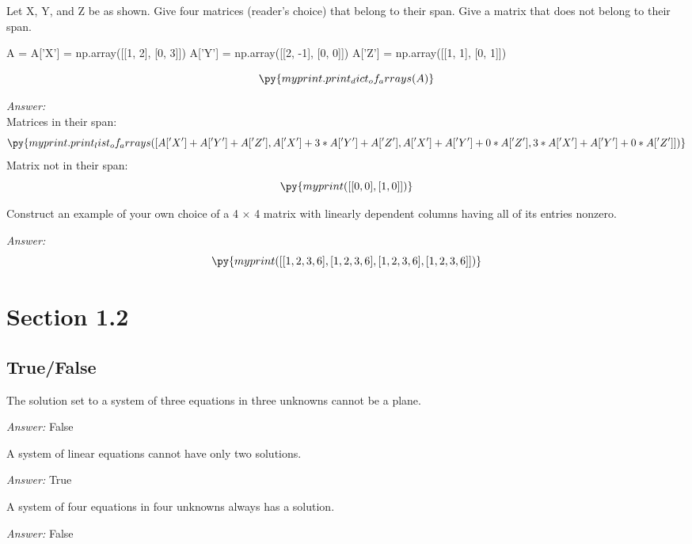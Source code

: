 \documentclass[letter]{article}
\newcommand{\ans}{\textit{Answer: }}
\newenvironment{question}[2][Question]{\begin{trivlist}
\item[\hskip \labelsep {\bfseries #1}\hskip \labelsep {\bfseries #2.}]}{\end{trivlist}}
\begin{document}
\begin{question}{1.23}
  Let X, Y, and Z be as shown. Give four matrices (reader’s choice) that belong to their span. Give a matrix that does not belong to their span.

  \begin{pycode}
A = {}
A['X'] = np.array([[1, 2], [0, 3]])
A['Y'] = np.array([[2, -1], [0, 0]])
A['Z'] = np.array([[1, 1], [0, 1]])
  \end{pycode}
  
  $$\py{myprint.print_dict_of_arrays(A)}$$

  \ans \\
  Matrices in their span:
  $$\py{myprint.print_list_of_arrays([
    A['X'] + A['Y'] + A['Z'],
    A['X'] + 3 * A['Y'] + A['Z'],
    A['X'] + A['Y'] + 0 * A['Z'],
    3 * A['X'] + A['Y'] + 0 * A['Z']
  ])}$$
  Matrix not in their span:
  $$\py{myprint([[0, 0], [1, 0]])}$$
 
\end{question}

\begin{question}{1.30}
  Construct an example of your own choice of a 4 × 4 matrix with linearly dependent columns having all of its entries nonzero.

  \ans 
  $$\py{myprint([
    [1, 2, 3, 6],
    [1, 2, 3, 6],
    [1, 2, 3, 6],
    [1, 2, 3, 6]
  ])}$$
  
\end{question}

\section{Section 1.2}
\subsection{True/False}

\begin{question}{1.13}
  The solution set to a system of three equations in three unknowns cannot be a plane.

  \ans False
\end{question}

\begin{question}{1.14}
  A system of linear equations cannot have only two solutions.
  
  \ans True
\end{question}

\begin{question}{1.16}
  A system of four equations in four unknowns always has a solution.
  
  \ans False
\end{question}
\end{document}
